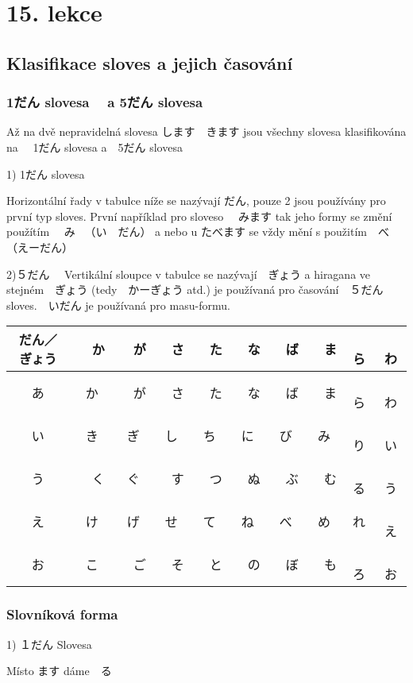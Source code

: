 \section{15. lekce}
\label{sec:lekce_15}


\subsection{Klasifikace sloves a jejich časování}

\subsubsection{1だん slovesa　 a 5だん slovesa}

Až na dvě nepravidelná slovesa します　きます jsou všechny slovesa klasifikována na 　1だん slovesa a　5だん slovesa　

1) 1だん slovesa

Horizontální řady v tabulce níže se nazývají だん, pouze 2 jsou používány pro první typ sloves. První například pro sloveso 　みます tak jeho formy se změní použítím 　み 　（い　だん） a  nebo u たべます se vždy mění s použitím　べ　（えーだん）


2)５だん　
Vertikální sloupce v tabulce se nazývají　ぎょう a hiragana ve stejném　ぎょう (tedy　かーぎょう atd.) je používaná pro časování　５だん sloves.　いだん je používaná pro masu-formu.  
\begin{center}
\begin{tabular}{|c||c|c|c|c|c|c|c|c|c|}
\hline
だん／ぎょう&　か&　が&　さ&　た&　な&　ば&　ま&　ら&　わ\\
\hline
あ　&か&　が&　さ&　た&　な&　ば&　ま&　ら&　わ\\
\hline
い　&き　&ぎ　&し　&ち　&に　&び　&み&　り&　い\\
\hline
う&　く　&ぐ&　す&　つ&　ぬ&　ぶ&　む&　る&　う\\
\hline
え　&け　&げ　&せ　&て　&ね　&べ　&め　&れ&　え\\
\hline
お　&こ&　ご&　そ&　と&　の&　ぼ&　も&　ろ&　お\\
\hline
\end{tabular}
\end{center}


\subsubsection{Slovníková forma}
1) １だん Slovesa

Místo ます dáme　る　

